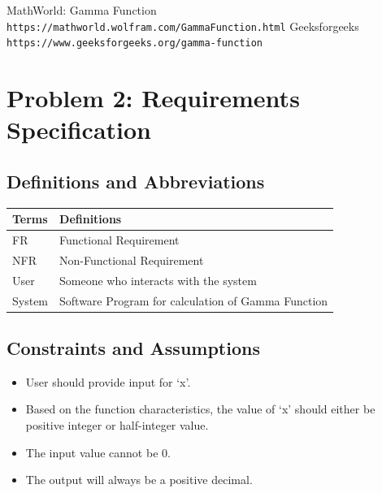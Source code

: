 \documentclass[a4paper,12pt]{article}
\begin{document}
    \begin{thebibliography}{}
        \bibitem{}
        MathWorld: Gamma Function
        \\\texttt{https://mathworld.wolfram.com/GammaFunction.html}
        \bibitem{}
        Geeksforgeeks
        \\\texttt{https://www.geeksforgeeks.org/gamma-function}
    \end{thebibliography}
    
    \newpage
    
\section{Problem 2: Requirements Specification}
    \subsection{Definitions and Abbreviations}
    \begin{center}
    \begin{tabular}{ |p{3cm} | p{10cm}| }
        \hline
        \textbf{Terms} & \textbf{Definitions} \\
        \hline
        FR & Functional Requirement \\
        \hline
        NFR & Non-Functional Requirement \\
        \hline
        User & Someone who interacts with the system \\
        \hline
        System & Software Program for calculation of Gamma Function \\
        \hline
    \end{tabular}
    \end{center}

    \subsection{Constraints and Assumptions}
    \begin{itemize}
        \item User should provide input for ‘x’.
        \item Based on the function characteristics, the value of ‘x’ should either be positive integer or half-integer value.
        \item The input value cannot be 0.
        \item The output will always be a positive decimal.
    \end{itemize}
\end{document}
